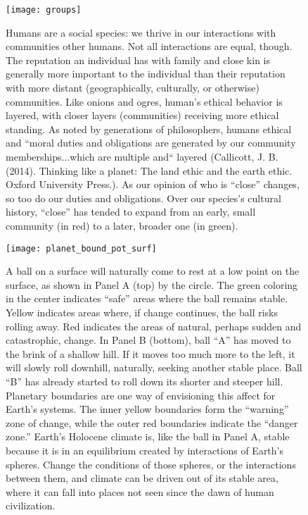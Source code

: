 \documentclass[amstex,12pt]{book}
\begin{document}
\newpage
\begin{figure}[p]
\centering
  \texttt{[image: groups]}%
\caption{Humans are a social species: we thrive in our interactions with communities other humans. Not all interactions are equal, though. The reputation an individual has with family and close kin is generally more important to the individual than their reputation with more distant (geographically, culturally, or otherwise) communities. Like onions and ogres, human's ethical behavior is layered, with closer layers (communities) receiving more ethical standing. As noted by generations of philosophers, humans ethical and  ``moral duties and obligations are generated by our community memberships...which are multiple and`` layered (Callicott, J. B. (2014). Thinking like a planet: The land ethic and the earth ethic. Oxford University Press.). As our opinion of who is ``close'' changes, so too do our duties and obligations. Over our species's cultural history, ``close'' has tended to expand from an early, small community (in red) to a later, broader one (in green).}
\label{fig:groups}
\end{figure}


\newpage
\begin{figure}[p]
\centering
  \texttt{[image: planet\_bound\_pot\_surf]}%

\caption{A ball on a surface will naturally come to rest at a low point on the surface, as shown in Panel A (top) by the circle. The green coloring in the center indicates ``safe'' areas where the ball remains stable. Yellow indicates areas where, if change continues, the ball risks rolling away. Red indicates the areas of natural, perhaps sudden and catastrophic, change.  In Panel B (bottom), ball ``A'' has moved to the brink of a shallow hill. If it moves too much more to the left, it will slowly roll downhill, naturally, seeking another stable place. Ball ``B'' has already started to roll down its shorter and steeper hill.  Planetary boundaries are one way of envisioning this affect for Earth's systems. The inner yellow boundaries form the ``warning'' zone of change, while the outer red boundaries indicate the ``danger zone.'' Earth's Holocene climate is, like the ball in Panel A, stable because it is in an equilibrium created by interactions of Earth's spheres. Change the conditions of those spheres, or the interactions between them, and climate can be driven out of its stable area, where it can fall into places not seen since the dawn of human civilization.}
\label{fig:planet_bound_pot_surf}
\end{figure}
\end{document}
